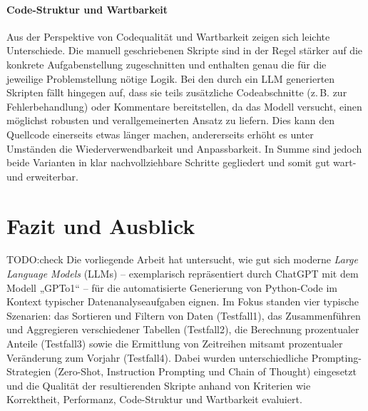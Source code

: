 \documentclass[11pt,a4paper]{article}
\begin{document}
\paragraph{Code-Struktur und Wartbarkeit}
Aus der Perspektive von Codequalität und Wartbarkeit zeigen sich leichte Unterschiede. Die manuell geschriebenen Skripte sind in der Regel stärker auf die konkrete Aufgabenstellung zugeschnitten und enthalten genau die für die jeweilige Problemstellung nötige Logik. Bei den durch ein LLM generierten Skripten fällt hingegen auf, dass sie teils zusätzliche Codeabschnitte (z.\,B. zur Fehlerbehandlung) oder Kommentare bereitstellen, da das Modell versucht, einen möglichst robusten und verallgemeinerten Ansatz zu liefern. Dies kann den Quellcode einerseits etwas länger machen, andererseits erhöht es unter Umständen die Wiederverwendbarkeit und Anpassbarkeit. In Summe sind jedoch beide Varianten in klar nachvollziehbare Schritte gegliedert und somit gut wart- und erweiterbar.

\section{Fazit und Ausblick}
\label{sec:fazit}
TODO:check
Die vorliegende Arbeit hat untersucht, wie gut sich moderne \emph{Large Language Models} (LLMs) – exemplarisch repräsentiert durch ChatGPT mit dem Modell „GPTo1“ – für die automatisierte Generierung von Python-Code im Kontext typischer Datenanalyseaufgaben eignen. Im Fokus standen vier typische Szenarien: das Sortieren und Filtern von Daten (Testfall1), das Zusammenführen und Aggregieren verschiedener Tabellen (Testfall2), die Berechnung prozentualer Anteile (Testfall3) sowie die Ermittlung von Zeitreihen mitsamt prozentualer Veränderung zum Vorjahr (Testfall4). Dabei wurden unterschiedliche Prompting-Strategien (Zero-Shot, Instruction Prompting und Chain of Thought) eingesetzt und die Qualität der resultierenden Skripte anhand von Kriterien wie Korrektheit, Performanz, Code-Struktur und Wartbarkeit evaluiert.
\end{document}
